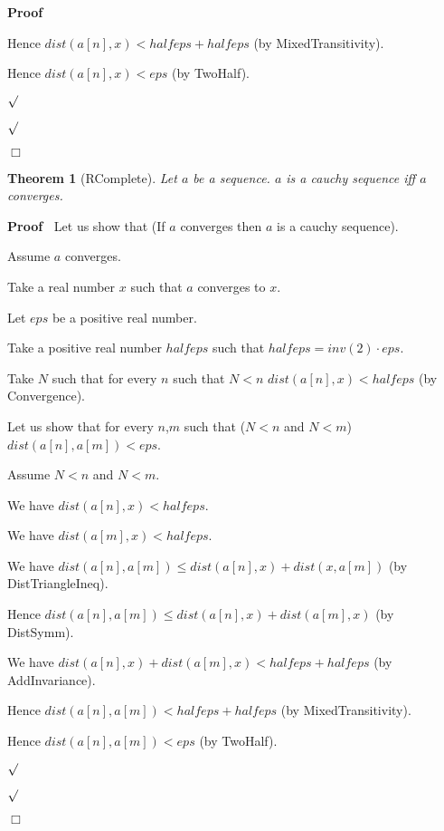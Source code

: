 \documentclass{article}
\newenvironment{forthel}{\begin{leftbar}}{\end{leftbar}}
\newenvironment{proof}{\noindent\textbf{Proof\ }}{\hspace*{\fill}$\Box$\medskip}
\newenvironment{subproof}{\begin{list}{}{}
		\item[\text{Proof}]}{\hfill $\surd$ \end{list}}
\newtheorem{theorem}{Theorem}
\begin{document}
\begin{forthel}
\begin{proof}
\begin{subproof}
\begin{subproof}
				Hence $dist(a[n],x) < halfeps + halfeps$ (by MixedTransitivity).
				
				Hence $dist(a[n],x) < eps$ (by TwoHalf).
				
			\end{subproof}
			
		\end{subproof}
	\end{proof}
	
	\begin{theorem}[RComplete]
		Let $a$ be a sequence. $a$ is a cauchy sequence iff $a$ converges.
	\end{theorem}
	
	\begin{proof}
		Let us show that (If $a$ converges then $a$ is a cauchy sequence).
		
		\begin{subproof}
			Assume $a$ converges.
			
			Take a real number $x$ such that $a$ converges to $x$.
			
			Let $eps$ be a positive real number.
			
			Take a positive real number $halfeps$ such that $halfeps = inv(2) \cdot eps$.
			
			Take $N$ such that for every $n$ such that $N < n$ $dist(a[n],x) < halfeps$ (by Convergence).
			
			Let us show that for every $n$,$m$ such that ($N < n$ and $N < m$) $dist(a[n],a[m]) < eps$.
			
			\begin{subproof}
				Assume $N < n$ and $N < m$.
				
				We have $dist(a[n],x) < halfeps$.
				
				We have $dist(a[m],x) < halfeps$.
				
				We have $dist(a[n],a[m]) \leq dist(a[n],x) + dist(x,a[m])$ (by DistTriangleIneq).
				
				Hence $dist(a[n],a[m]) \leq dist(a[n],x) + dist(a[m],x)$ (by DistSymm).
				
				We have $dist(a[n],x) + dist(a[m],x) < halfeps + halfeps$ (by AddInvariance).
				
				Hence $dist(a[n],a[m]) < halfeps + halfeps$ (by MixedTransitivity).
				
				Hence $dist(a[n],a[m]) < eps$ (by TwoHalf).
				
			\end{subproof}
			
		\end{subproof}
		

\end{proof}
\end{forthel}
\end{document}
